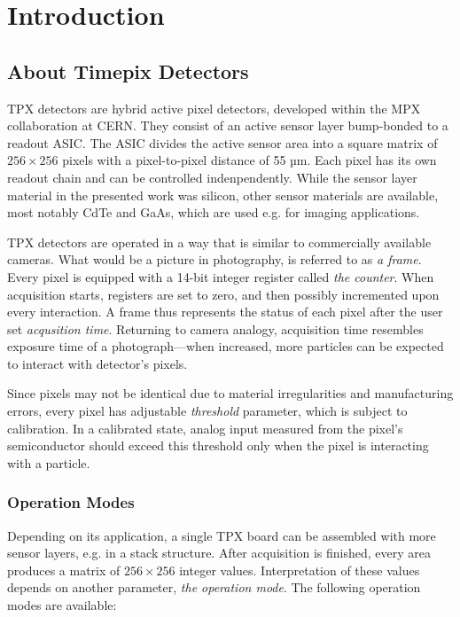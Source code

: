 \chapter{Introduction}

\section{About Timepix Detectors}
TPX detectors are hybrid active pixel detectors, developed within the MPX collaboration at CERN. They consist of an active sensor layer bump-bonded to a readout ASIC. The ASIC divides the active sensor area into a square matrix of $256 \times 256$ pixels with a pixel-to-pixel distance of 55 µm. Each pixel has its own readout chain and can be controlled indenpendently. While the sensor layer material in the presented work was silicon, other sensor materials are available, most notably CdTe and GaAs, which are used e.g. for imaging applications.

TPX detectors are operated in a way that is similar to commercially available cameras. What would be a picture in photography, is referred to as \textit{a frame}. Every pixel is equipped with a 14-bit integer register called \textit{the counter}. When acquisition starts, registers are set to zero, and then possibly incremented upon every interaction. A frame thus represents the status of each pixel after the user set \textit{acqusition time}. Returning to camera analogy, acquisition time resembles exposure time of a photograph---when increased, more particles can be expected to interact with detector's pixels.

Since pixels may not be identical due to material irregularities and manufacturing errors, every pixel has adjustable \textit{threshold} parameter, which is subject to calibration. In a calibrated state, analog input measured from the pixel's semiconductor should exceed this threshold only when the pixel is interacting with a particle.

\subsection{Operation Modes}
Depending on its application, a single TPX board can be assembled with more sensor layers, e.g. in a stack structure. After acquisition is finished, every area produces a matrix of $256\times 256$ integer values. Interpretation of these values depends on another parameter, \textit{the operation mode}. The following operation modes are available:

